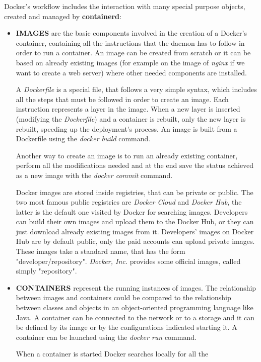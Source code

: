 \documentclass[a4paper,12pt]{article}
\begin{document}
Docker's workflow includes the interaction with many special purpose objects,
created and managed by \textbf{containerd}:
\begin{itemize}
  \item \textbf{IMAGES} are the basic components involved in the creation of a
  Docker's container, containing all the instructions that the daemon has to
  follow in order to run a container. An image can be created from scratch or it
  can be based on already existing images (for example on the image of
  \textit{nginx} if we want to create a web server) where other needed
  components are installed. \par A \textit{Dockerfile} is a special file, that
  follows a very simple syntax, which includes all the steps that must be
  followed in order to create an image. Each instruction represents a layer in
  the image. When a new layer is inserted (modifying the \textit{Dockerfile})
  and a container is rebuilt, only the new layer is rebuilt, speeding up the
  deployment's process. An image is built from a Dockerfile using the
  \textit{docker build} command. \par Another way to create an image is to run
  an already existing container, perform all the modifications needed and at the
  end save the status achieved as a new image with the \textit{docker commit}
  command.\par Docker images are stored inside registries, that can be private
  or public. The two most famous public registries are \textit{Docker Cloud} and
  \textit{Docker Hub}, the latter is the default one visited by Docker for
  searching images. Developers can build their own images and upload them to the
  Docker Hub, or they can just download already existing images from it.
  Developers' images on Docker Hub are by default public, only the paid accounts
  can upload private images. These images take a standard name, that has the
  form "developer/repository". \textit{Docker, Inc.} provides some official
  images, called simply "repository".  
  \item \textbf{CONTAINERS} represent the running instances of images. The
  relationship between images and containers could be compared to the
  relationship between classes and objects in an object-oriented programming
  language like Java. A container can be connected to the network or to a
  storage and it can be defined by its image or by the configurations indicated
  starting it. A container can be launched using the \textit{docker run}
  command.\par When a container is started Docker searches locally for all the

\end{itemize}
\end{document}
